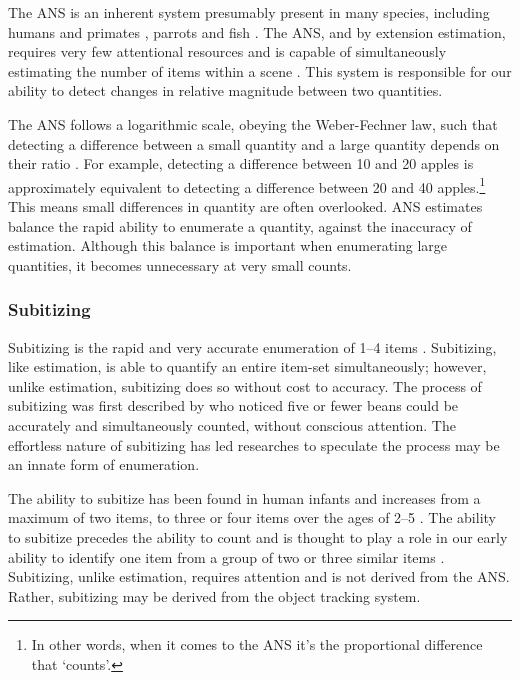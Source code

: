 The ANS is an inherent system presumably present in many species, including humans and primates \cite{woodruff1981primative}, parrots \cite{pepperberg2005number} and fish \cite{pepperberg2005number}. The ANS, and by extension estimation, requires very few attentional resources \cite{Burr2010} and is capable of simultaneously estimating the number of items within a scene \cite{gallistel1992ANS,dehaene2011NumSense}. This system is responsible for our ability to detect changes in relative magnitude between two quantities.

The ANS follows a logarithmic scale, obeying the Weber-Fechner law, such that detecting a difference between a small quantity and a large quantity depends on their ratio \cite{fechner1860}. For example, detecting a difference between 10 and 20 apples is approximately equivalent to detecting a difference between 20 and 40 apples.\footnote{In other words, when it comes to the ANS it's the proportional difference that `counts'.} This means small differences in quantity are often overlooked. ANS estimates balance the rapid ability to enumerate a quantity, against the inaccuracy of estimation. Although this balance is important when enumerating large quantities, it becomes unnecessary at very small counts.

\subsubsection{Subitizing}
Subitizing is the rapid and very accurate enumeration of 1--4 items \cite{kaufman1949subtizing}. Subitizing, like estimation, is able to quantify an entire item-set simultaneously; however, unlike estimation, subitizing does so without cost to accuracy. The process of subitizing was first described by \nocite{kaufman1949subtizing} who noticed five or fewer beans could be accurately and simultaneously counted, without conscious attention. The effortless nature of subitizing has led researches to speculate the process may be an innate form of enumeration.

The ability to subitize has been found in human infants \cite{fitzhugh1978role, klein1988universals} and increases from a maximum of two items, to three or four items over the ages of 2--5 \cite{starkey1995development}. The ability to subitize precedes the ability to count \cite{fitzhugh1978role} and is thought to play a role in our early ability to identify one item from a group of two or three similar items \cite{starkey1995development}. Subitizing, unlike estimation, requires attention \cite{Burr2010} and is not derived from the ANS. Rather, subitizing may be derived from the object tracking system.

